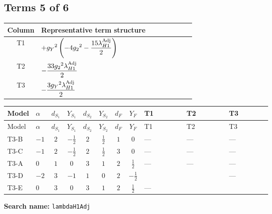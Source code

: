 \documentclass[8pt]{article}
\begin{document}
\begin{landscape}
\subsection*{Terms 5 of 6}
\begin{center}
\begin{tabular}{@{}c >{\raggedright\arraybackslash}p{0.82\linewidth}@{}}
\toprule
Column & Representative term structure \\
\midrule
T1 & \(\displaystyle +{g_Y}^2 \left(-4 {g_2}^2-\frac{15 {\lambda_{H1}^{\rm Adj}}}{2}\right)\) \\
\midrule
T2 & \(\displaystyle -\frac{33 {g_2}^2 {\lambda_{H1}^{\rm Adj}}}{2}\) \\
\midrule
T3 & \(\displaystyle -\frac{3 {g_Y}^2 {\lambda_{H1}^{\rm Adj}}}{2}\) \\
\midrule
\bottomrule
\end{tabular}
\end{center}
\smallskip
\tiny
\begin{longtable}{@{}llcccccc >{\raggedright\arraybackslash}p{0.21\linewidth} >{\raggedright\arraybackslash}p{0.21\linewidth} >{\raggedright\arraybackslash}p{0.21\linewidth}@{}}
\toprule
Model & $\alpha$ & $d_{S_1}$ & $Y_{S_1}$ & $d_{S_2}$ & $Y_{S_2}$ & $d_F$ & $Y_F$ & T1 & T2 & T3 \\
\midrule
\endfirsthead
\toprule
Model & $\alpha$ & $d_{S_1}$ & $Y_{S_1}$ & $d_{S_2}$ & $Y_{S_2}$ & $d_F$ & $Y_F$ & T1 & T2 & T3 \\
\midrule
\endhead
T3-B & $-1$ & $2$ & $-\frac{1}{2}$ & $2$ & $\frac{1}{2}$ & $1$ & $0$ & --- & --- & --- \\
\midrule
T3-C & $-1$ & $2$ & $-\frac{1}{2}$ & $2$ & $\frac{1}{2}$ & $3$ & $0$ & --- & --- & --- \\
\midrule
T3-A & $0$ & $1$ & $0$ & $3$ & $1$ & $2$ & $\frac{1}{2}$ & --- & --- & --- \\
\midrule
T3-D & $-2$ & $3$ & $-1$ & $1$ & $0$ & $2$ & $-\frac{1}{2}$ & \scriptsize\adjustbox{max width=\linewidth}{$\begin{gathered} +{g_Y}^2 \left(-4 {g_2}^2-\frac{15 {\lambda_{H1}^{\rm Adj}}}{2}\right)\end{gathered}$} & \scriptsize\adjustbox{max width=\linewidth}{$\begin{gathered} -\frac{33 {g_2}^2 {\lambda_{H1}^{\rm Adj}}}{2}\end{gathered}$} & --- \\
\midrule
T3-E & $0$ & $3$ & $0$ & $3$ & $1$ & $2$ & $\frac{1}{2}$ & --- & \scriptsize\adjustbox{max width=\linewidth}{$\begin{gathered} -\frac{33 {g_2}^2 {\lambda_{H1}^{\rm Adj}}}{2}\end{gathered}$} & \scriptsize\adjustbox{max width=\linewidth}{$\begin{gathered} -\frac{3 {g_Y}^2 {\lambda_{H1}^{\rm Adj}}}{2}\end{gathered}$} \\
\midrule
\bottomrule
\end{longtable}
\clearpage
\noindent\textbf{Search name: }\texttt{lambdaH1Adj}\par\smallskip

\end{landscape}
\end{document}
